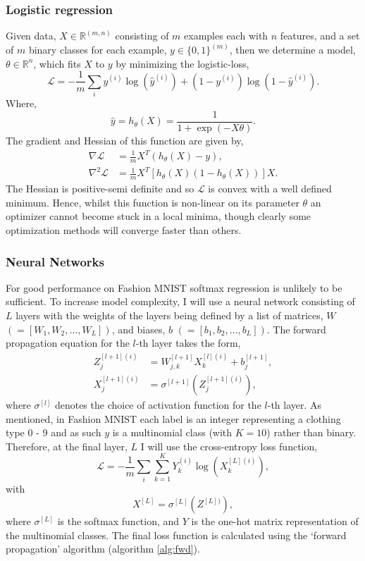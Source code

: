 \documentclass[11pt,twocolumn]{article}
\begin{document}
\subsubsection*{Logistic regression}
Given data, $X \in \mathbb{R}^{(m,n)}$ consisting of $m$ examples each with $n$ features, and a set of $m$ binary classes for each example, $y\in \{0,1\}^{(m)}$, then we determine a model, $\theta \in \mathbb{R}^n$, which fits $X$ to $y$ by minimizing the logistic-loss, 
\begin{equation}
\mathcal{L}=-\frac{1}{m}\sum_{i}y^{(i)}\log{(\widehat{y}^{(i)})}+(1-y^{(i)})\log{(1-\widehat{y}^{(i)})}.\label{logistic_func}
\end{equation}
Where,
\begin{equation}
\widehat{y}=h_{\theta}(X)=\frac{1}{1+\exp(-X \theta)}.
\end{equation}
The gradient and Hessian of this function are given by,
\begin{align}
\nabla \mathcal{L}&=\frac{1}{m}X^{T}(h_{\theta}(X)-y),\\
\nabla^2 \mathcal{L}&=\frac{1}{m}X^{T}[h_{\theta}(X)(1-h_{\theta}(X))]X.
\end{align}
The Hessian is positive-semi definite and so $\mathcal{L}$ is convex with a well defined minimum. Hence, whilst this function is non-linear on its parameter $\theta$ an optimizer cannot become stuck in a local minima, though clearly some optimization methods will converge faster than others.

\subsubsection*{Neural Networks}
For good performance on Fashion MNIST softmax regression is unlikely to be sufficient. To increase model complexity, I will use a neural network consisting of $L$ layers with the weights of the layers being defined by a list of matrices, $W$ $(=[W_1,W_2,\ldots,W_L])$, and biases, $b$ $(=[b_1,b_2,\ldots,b_L])$. The forward propagation equation for the $l$-th layer takes the form,
\begin{align}
Z^{[l+1](i)}_j&=W^{[l+1]}_{j,k}X^{[l](i)}_k+b^{[l+1]}_j,  \label{propZ}\\
X^{[l+1](i)}_j&=\sigma^{[l+1]}(Z^{[l+1](i)}_j)\label{propX},
\end{align}
where $\sigma^{[l]}$ denotes the choice of activation function for the $l$-th layer. As mentioned, in Fashion MNIST each label is an integer representing a clothing type 0 - 9 and as such $y$ is a multinomial class (with $K=10$) rather than binary.  Therefore, at  the final layer, $L$ I will use the cross-entropy loss function,
\begin{equation}
\mathcal{L}=-\frac{1}{m}\sum_{i}\sum_{k=1}^{K} Y^{(i)}_k\log{(X^{[L](i)}_k)},\label{celossfunc}
\end{equation}
with
\begin{equation}
X^{[L]}=\sigma^{[L]}{(Z^{[L])})},
\end{equation}
where $\sigma^{[L]}$ is the softmax function, and $Y$ is the one-hot matrix representation of the multinomial classes. The final loss function is calculated using the `forward propagation' algorithm (algorithm \ref{alg:fwd}).
\end{document}
